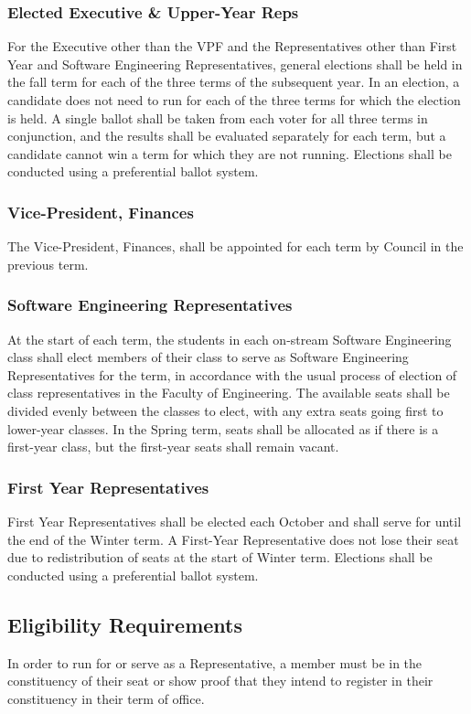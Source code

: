 \subsubsection{Elected Executive \& Upper-Year Reps}
For the Executive other than the VPF and the Representatives other than First
Year and Software Engineering Representatives, general elections shall be held
in the fall term for each of the three terms of the subsequent year. In an
election, a candidate does not need to run for each of the three terms for which
the election is held. A single ballot shall be taken from each voter for all
three terms in conjunction, and the results shall be evaluated separately for
each term, but a candidate cannot win a term for which they are not running.
Elections shall be conducted using a preferential ballot system.

\subsubsection{Vice-President, Finances}
The Vice-President, Finances, shall be appointed for each term by Council in the
previous term.

\subsubsection{Software Engineering Representatives}
At the start of each term, the students in each on-stream Software Engineering
class shall elect members of their class to serve as Software Engineering
Representatives for the term, in accordance with the usual process of election
of class representatives in the Faculty of Engineering. The available seats
shall be divided evenly between the classes to elect, with any extra seats going
first to lower-year classes. In the Spring term, seats shall be allocated as if
there is a first-year class, but the first-year seats shall remain vacant.

\subsubsection{First Year Representatives}
First Year Representatives shall be elected each October and shall serve for
until the end of the Winter term. A First-Year Representative does not lose
their seat due to redistribution of seats at the start of Winter term. Elections
shall be conducted using a preferential ballot system.

\subsection{Eligibility Requirements}
In order to run for or serve as a Representative, a member must be in the
constituency of their seat or show proof that they intend to register in their
constituency in their term of office.

